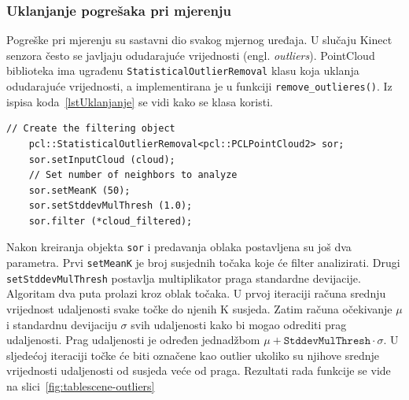 

\newpage
\subsubsection{Uklanjanje pogrešaka pri mjerenju} %
\label{ssub:Uklanjanje pogrešaka pri mjerenju}
Pogreške pri mjerenju su sastavni dio svakog mjernog uređaja. U slučaju
Kinect senzora često se javljaju odudarajuće vrijednosti (engl.
\textit{outliers}). PointCloud biblioteka ima ugrađenu
\texttt{StatisticalOutlierRemoval} klasu koja uklanja odudarajuće
vrijednosti, a implementirana je u funkciji
\texttt{remove\_outlieres()}. Iz ispisa koda~\ref{lstUklanjanje} se
vidi kako se klasa koristi.

\begin{lstlisting}[label=lstUklanjanje, caption={Dio izvornog koda za 
    uklanjanje odudarajaućih vrijednosti iz funkcije \texttt{remove\_outliers()} }]
    // Create the filtering object
    pcl::StatisticalOutlierRemoval<pcl::PCLPointCloud2> sor;
    sor.setInputCloud (cloud);
    // Set number of neighbors to analyze
    sor.setMeanK (50);
    sor.setStddevMulThresh (1.0);
    sor.filter (*cloud_filtered);
\end{lstlisting}

Nakon kreiranja objekta \texttt{sor} i predavanja oblaka postavljena su
još dva parametra. Prvi \texttt{setMeanK} je broj susjednih točaka koje
će filter analizirati. Drugi \texttt{setStddevMulThresh} postavlja
multiplikator praga standardne devijacije. Algoritam dva puta prolazi
kroz oblak točaka. U prvoj iteraciji računa srednju vrijednost
udaljenosti svake točke do njenih K susjeda. Zatim računa očekivanje
\(\mu\) i standardnu devijaciju \(\sigma\) svih udaljenosti kako bi
mogao odrediti prag udaljenosti. Prag udaljenosti je određen jednadžbom
\(\mu+\texttt{StddevMulThresh}\cdot\sigma\). U sljedećoj iteraciji točke
će biti označene kao outlier ukoliko su njihove srednje vrijednosti
udaljenosti od susjeda veće od praga. Rezultati rada funkcije se vide na
slici~\ref{fig:tablescene-outliers}
 

